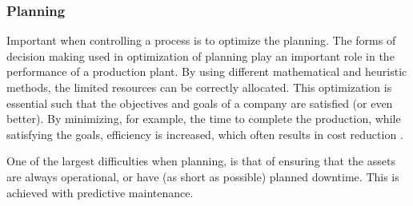 \subsubsection{Planning}
Important when controlling a process is to optimize the planning. The forms of decision making used in optimization of planning play an important role in the performance of a production plant. By using different mathematical and heuristic methods, the limited resources can be correctly allocated. This optimization is essential such that the objectives and goals of a company are satisfied (or even better). By minimizing, for example, the time to complete the production, while satisfying the goals, efficiency is increased, which often results in cost reduction \citep{pinedo2005planning}. 

One of the largest difficulties when planning, is that of ensuring that the assets are always operational, or have (as short as possible) planned downtime. This is achieved with predictive maintenance.
%
